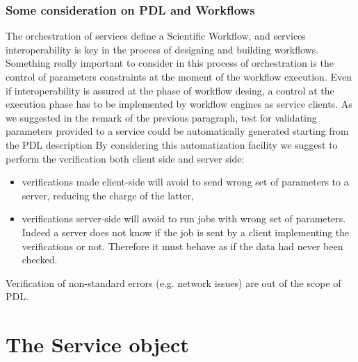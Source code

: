 \documentclass[a4paper,11pt] {ivoa}
\begin{document}
\subsubsection{Some consideration on PDL and Workflows}\label{PDLWF}
The orchestration of services define a Scientific Workflow, and services interoperability is key in the process of designing and building workflows. Something really important to consider in this process of orchestration is the control of parameters constraints at the moment of the workflow execution. Even if interoperability is assured at the phase of workflow desing, a control at the execution phase has to be implemented by workflow engines as service clients. 
As we suggested in the remark of the previous paragraph, test for validating parameters provided to a service could be automatically generated starting from the PDL description 
By considering this automatization facility we suggest to perform the verification both client side and server side:
\begin{itemize}
\item verifications made client-side will avoid to send wrong set of parameters to a server, reducing the charge of the latter,
\item verifications server-side will avoid to run jobs with wrong set of parameters. Indeed a server does not know if the job is sent by a client implementing the verifications or not. Therefore it must behave as if the data had never been checked. 
\end{itemize}
Verification of non-standard errors (e.g. network issues) are out of the scope of PDL.


\section{The Service object}\label{par-service}
\end{document}
